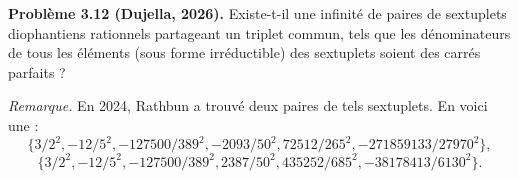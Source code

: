 \textbf{Problème 3.12 (Dujella, 2026).} Existe-t-il une infinité de paires de sextuplets diophantiens rationnels partageant un triplet commun, tels que les dénominateurs de tous les éléments (sous forme irréductible) des sextuplets soient des carrés parfaits ?

\medskip

\textit{Remarque.} En 2024, Rathbun a trouvé deux paires de tels sextuplets. En voici une :
\[
\{3/2^2, -12/5^2, -127500/389^2, -2093/50^2, 72512/265^2, -271859133/27970^2\},
\]
\[
\{3/2^2, -12/5^2, -127500/389^2, 2387/50^2, 435252/685^2, -38178413/6130^2\}.
\]
